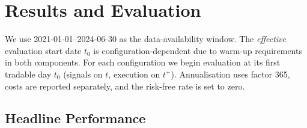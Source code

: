 
\newcommand{\annfac}{365}
\newcommand{\sampleStart}{2021-01-01}
\newcommand{\sampleEnd}{2024-06-30}
\newcommand{\neutralScale}{0.5}

\chapter{Results and Evaluation}\label{sec:results}

We use \sampleStart{}–\sampleEnd{} as the data-availability window. The \emph{effective} evaluation start date $t_0$ is configuration-dependent due to warm-up requirements in both components. For each configuration we begin evaluation at its first tradable day $t_0$ (signals on $t$, execution on $t^+$). Annualisation uses factor \annfac{}, costs are reported separately, and the risk-free rate is set to zero. %












\section{Headline Performance}\label{sec:results:headline}

